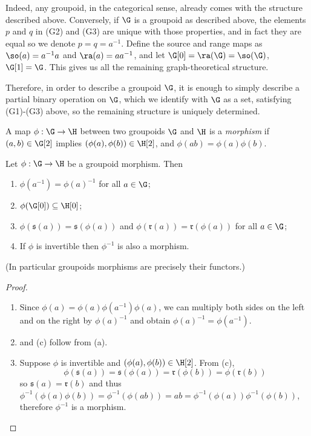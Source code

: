 Indeed, any groupoid, in the categorical sense, already comes with the structure described above. Conversely, if $\G$ is a groupoid as described above, the elements $p$ and $q$ in (G2) and (G3) are unique with those properties, and in fact they are equal so we denote $p=q=a^{-1}$. Define the source and range maps as $\so(a)=a^{-1}a$ and $\ra(a)=aa^{-1}$, and let $\G[0]=\ra(\G)=\so(\G)$, $\G[1]=\G$. This gives us all the remaining graph-theoretical structure.

Therefore, in order to describe a groupoid $\G$, it is enough to simply describe a partial binary operation on $\G$, which we identify with $\G$ as a set, satisfying (G1)-(G3) above, so the remaining structure is uniquely determined.

\begin{definition}
A map $\phi:\G\to\H$ between two groupoids $\G$ and $\H$ is a \emph{morphism} if $(a,b)\in\G[2]$ implies $(\phi(a),\phi(b))\in\H[2]$, and $\phi(ab)=\phi(a)\phi(b)$.
\end{definition}

\begin{proposition}\label{propositiongroupoidmorphism}
Let $\phi:\G\to\H$ be a groupoid morphism. Then
\begin{enumerate}
\item[(a)] $\phi(a^{-1})=\phi(a)^{-1}$ for all $a\in\G$;
\item[(b)] $\phi(\G[0])\subseteq\H[0]$;
\item[(c)] $\phi(\mathfrak{s}(a))=\mathfrak{s}(\phi(a))$ and $\phi(\mathfrak{r}(a))=\mathfrak{r}(\phi(a))$ for all $a\in\G$;
\item[(d)] If $\phi$ is invertible then $\phi^{-1}$ is also a morphism.
\end{enumerate}
(In particular groupoids morphisms are precisely their functors.)
\end{proposition}
\begin{proof}
\begin{enumerate}
\item[(a)] Since $\phi(a)=\phi(a)\phi(a^{-1})\phi(a)$, we can multiply both sides on the left and on the right by $\phi(a)^{-1}$ and obtain $\phi(a)^{-1}=\phi(a^{-1})$.
\item[(b)] and (c) follow from (a).
\item[(d)] Suppose $\phi$ is invertible and $(\phi(a),\phi(b))\in\H[2]$. From (c),
\[\phi(\mathfrak{s}(a))=\mathfrak{s}(\phi(a))=\mathfrak{r}(\phi(b))=\phi(\mathfrak{r}(b))\]
so $\mathfrak{s}(a)=\mathfrak{r}(b)$ and thus $\phi^{-1}(\phi(a)\phi(b))=\phi^{-1}(\phi(ab))=ab=\phi^{-1}(\phi(a))\phi^{-1}(\phi(b))$, therefore $\phi^{-1}$ is a morphism.\qedhere
\end{enumerate}
\end{proof}

